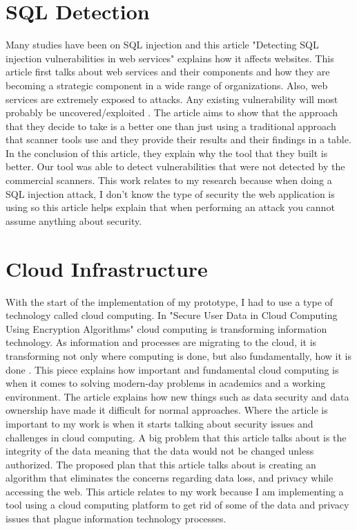 \section{SQL Detection}
\label{sec:SQL Detection}


Many studies have been on SQL injection and this article "Detecting SQL injection vulnerabilities in web services" explains how it affects websites. This article first talks about web services and their components and how they are becoming a strategic component in a wide range of organizations. Also, web services are extremely exposed to attacks. Any existing vulnerability will most probably be uncovered/exploited \cite{antunes2009detecting}.
The article aims to show that the approach that they decide to take is a better one than just using a traditional approach that scanner tools use and they provide their results and their findings in a table. In the conclusion of this article, they explain why the tool that they built is better. Our tool was able to detect vulnerabilities that were not detected by the commercial scanners. This work relates to my research because when doing a SQL injection attack, I don't know the type of security the web application is using so this article helps explain that when performing an attack you cannot assume anything about security.

\section{Cloud Infrastructure}
\label{sec:cloud infrastruture}
With the start of the implementation of my prototype, I had to use a type of technology called cloud computing. In "Secure User Data in Cloud Computing Using Encryption Algorithms" cloud computing is transforming information technology. As information and processes are migrating to the cloud, it is transforming not only where computing is done, but also fundamentally, how it is done \cite{arora2013secure}.
This piece explains how important and fundamental cloud computing is when it comes to solving modern-day problems in academics and a working environment. The article explains how new things such as data security and data ownership have made it difficult for normal approaches. Where the article is important to my work is when it starts talking about security issues and challenges in cloud computing. A big problem that this article talks about is the integrity of the data meaning that the data would not be changed unless authorized. The proposed plan that this article talks about is creating an algorithm that eliminates the concerns regarding data loss, and privacy while accessing the web. This article relates to my work because I am implementing a tool using a cloud computing platform to get rid of some of the data and privacy issues that plague information technology processes.

